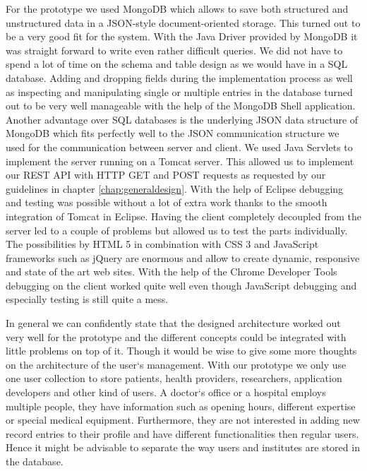 For the prototype we used MongoDB which allows to save both structured and unstructured data in a JSON-style document-oriented storage. This turned out to be a very good fit for the system. With the Java Driver provided by MongoDB it was straight forward to write even rather difficult queries. We did not have to spend a lot of time on the schema and table design as we would have in a SQL database. Adding and dropping fields during the implementation process as well as inspecting and manipulating single or multiple entries in the database turned out to be very well manageable with the help of the MongoDB Shell application. Another advantage over SQL databases is the underlying JSON data structure of MongoDB which fits perfectly well to the JSON communication structure we used for the communication between server and client.\newline
We used Java Servlets to implement the server running on a Tomcat server. This allowed us to implement our REST API with HTTP GET and POST requests as requested by our guidelines in chapter \ref{chap:generaldesign}. With the help of Eclipse debugging and testing was possible without a lot of extra work thanks to the smooth integration of Tomcat in Eclipse.\newline
Having the client completely decoupled from the server led to a couple of problems but allowed us to test the parts individually. The possibilities by HTML 5 in combination with CSS 3 and JavaScript frameworks such as jQuery are enormous and allow to create dynamic, responsive and state of the art web sites. With the help of the Chrome Developer Tools debugging on the client worked quite well even though JavaScript debugging and especially testing is still quite a mess. 

In general we can confidently state that the designed architecture worked out very well for the prototype and the different concepts could be integrated with little problems on top of it. Though it would be wise to give some more thoughts on the architecture of the user`s management. With our prototype we only use one user collection to store patients, health providers, researchers, application developers and other kind of users. A doctor`s office or a hospital employs multiple people, they have information such as opening hours, different expertise or special medical equipment. Furthermore, they are not interested in adding new record entries to their profile and have different functionalities then regular users. Hence it might be advisable to separate the way users and institutes are stored in the database. 

